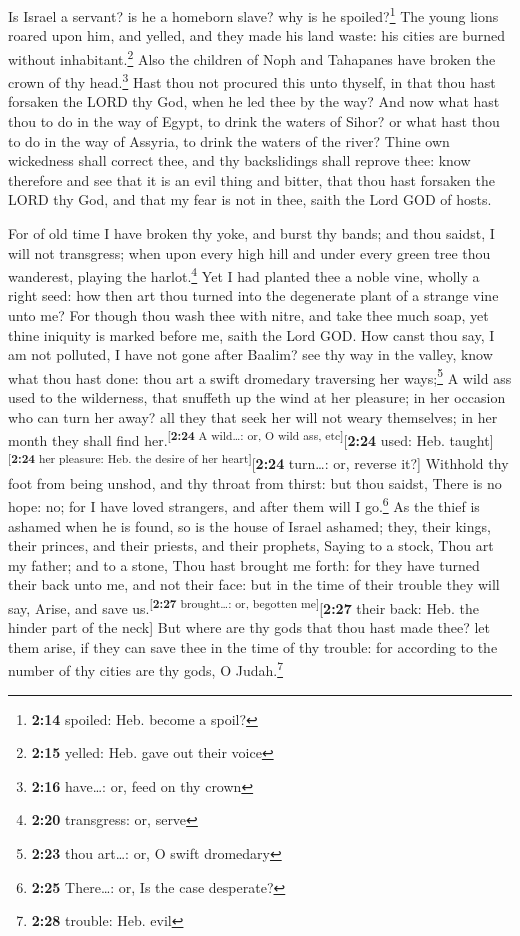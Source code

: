  Is Israel a servant? is he a homeborn slave? why is he
spoiled?\footnote{\textbf{2:14} spoiled: Heb. become a spoil?}
 The young lions roared upon him, and yelled, and they
made his land waste: his cities are burned without
inhabitant.\footnote{\textbf{2:15} yelled: Heb. gave out their voice}
 Also the children of Noph and Tahapanes have broken the
crown of thy head.\footnote{\textbf{2:16} have\ldots: or, feed on thy
  crown}  Hast thou not procured this unto thyself, in
that thou hast forsaken the LORD thy God, when he led thee by the way?
 And now what hast thou to do in the way of Egypt, to
drink the waters of Sihor? or what hast thou to do in the way of
Assyria, to drink the waters of the river?  Thine own
wickedness shall correct thee, and thy backslidings shall reprove thee:
know therefore and see that it is an evil thing and bitter, that thou
hast forsaken the LORD thy God, and that my fear is not in thee, saith
the Lord GOD of hosts.

 For of old time I have broken thy yoke, and burst thy
bands; and thou saidst, I will not transgress; when upon every high hill
and under every green tree thou wanderest, playing the
harlot.\footnote{\textbf{2:20} transgress: or, serve} 
Yet I had planted thee a noble vine, wholly a right seed: how then art
thou turned into the degenerate plant of a strange vine unto me?
 For though thou wash thee with nitre, and take thee much
soap, yet thine iniquity is marked before me, saith the Lord GOD.
 How canst thou say, I am not polluted, I have not gone
after Baalim? see thy way in the valley, know what thou hast done: thou
art a swift dromedary traversing her ways;\footnote{\textbf{2:23} thou
  art\ldots: or, O swift dromedary}  A wild ass used to
the wilderness, that snuffeth up the wind at her pleasure; in her
occasion who can turn her away? all they that seek her will not weary
themselves; in her month they shall find
her.\textsuperscript{{[}\textbf{2:24} A wild\ldots: or, O wild ass,
etc{]}}{[}\textbf{2:24} used: Heb.
taught{]}\textsuperscript{{[}\textbf{2:24} her pleasure: Heb. the desire
of her heart{]}}{[}\textbf{2:24} turn\ldots: or, reverse it?{]}
 Withhold thy foot from being unshod, and thy throat from
thirst: but thou saidst, There is no hope: no; for I have loved
strangers, and after them will I go.\footnote{\textbf{2:25} There\ldots:
  or, Is the case desperate?}  As the thief is ashamed
when he is found, so is the house of Israel ashamed; they, their kings,
their princes, and their priests, and their prophets, 
Saying to a stock, Thou art my father; and to a stone, Thou hast brought
me forth: for they have turned their back unto me, and not their face:
but in the time of their trouble they will say, Arise, and save
us.\textsuperscript{{[}\textbf{2:27} brought\ldots: or, begotten
me{]}}{[}\textbf{2:27} their back: Heb. the hinder part of the neck{]}
 But where are thy gods that thou hast made thee? let
them arise, if they can save thee in the time of thy trouble: for
according to the number of thy cities are thy gods, O Judah.\footnote{\textbf{2:28}
  trouble: Heb. evil}

